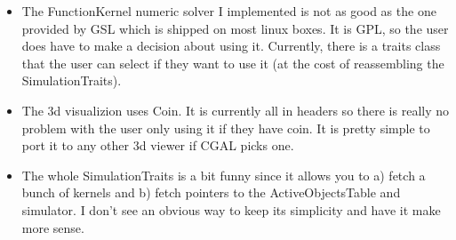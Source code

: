 \begin{itemize}
\item The FunctionKernel numeric solver I implemented is not as good
  as the one provided by GSL which is shipped on most linux boxes. It
  is GPL, so the user does have to make a decision about using it.
  Currently, there is a traits class that the user can select if they
  want to use it (at the cost of reassembling the SimulationTraits).

\item The 3d visualizion uses Coin. It is currently all in headers so
  there is really no problem with the user only using it if they have
  coin. It is pretty simple to port it to any other 3d viewer if CGAL
  picks one.

\item The whole SimulationTraits is a bit funny since it allows you to
  a) fetch a bunch of kernels and b) fetch pointers to the
  ActiveObjectsTable and simulator. I don't see an obvious way to keep
  its simplicity and have it make more sense.

\end{itemize}

